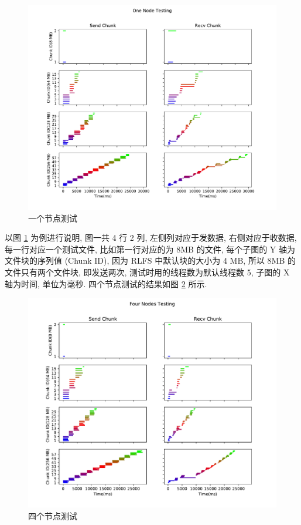 \begin{figure}[H]
    \centerline{\includegraphics[width=1.0\textwidth]{./Figures/onenode.pdf}}
    \caption{一个节点测试}
    \label{fig:onenode}
\end{figure}

以图 \ref{fig:onenode} 为例进行说明, 图一共 4 行 2 列, 左侧列对应于发数据, 右侧对应于收数据,
每一行对应一个测试文件, 比如第一行对应的为 8MB 的文件, 每个子图的 Y 轴为文件块的序列值
(Chunk ID), 因为 RLFS 中默认块的大小为 4 MB, 所以 8MB 的文件只有两个文件块, 即发送两次,
测试时用的线程数为默认线程数 5, 子图的 X 轴为时间, 单位为毫秒.
四个节点测试的结果如图 \ref{fig:fournodes} 所示.

\begin{figure}[H]
    \centerline{\includegraphics[width=1.0\textwidth]{./Figures/fournodes.pdf}}
    \caption{四个节点测试}
    \label{fig:fournodes}
\end{figure}


